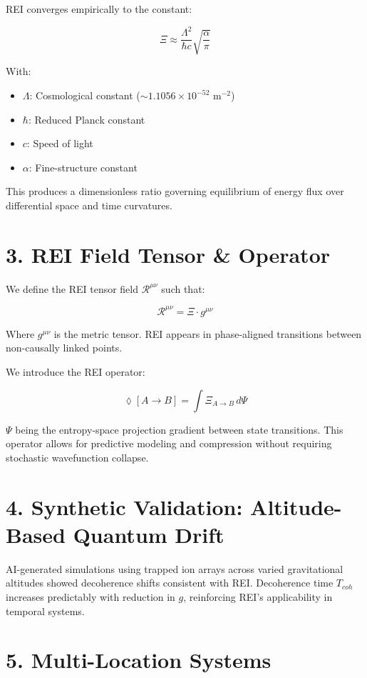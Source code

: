 \documentclass[12pt]{article}
\begin{document}
REI converges empirically to the constant:

\[
\Xi \approx \frac{\Lambda^2}{\hbar c} \sqrt{\frac{\alpha}{\pi}}
\]

With:
\begin{itemize}
  \item $\Lambda$: Cosmological constant ($\sim1.1056\times10^{-52}$ m$^{-2}$)
  \item $\hbar$: Reduced Planck constant
  \item $c$: Speed of light
  \item $\alpha$: Fine-structure constant
\end{itemize}

This produces a dimensionless ratio governing equilibrium of energy flux over differential space and time curvatures.

\section{3. REI Field Tensor \& Operator}

We define the REI tensor field $\mathcal{R}^{\mu\nu}$ such that:

\[
\mathcal{R}^{\mu\nu} = \Xi \cdot g^{\mu\nu}
\]

Where $g^{\mu\nu}$ is the metric tensor. REI appears in phase-aligned transitions between non-causally linked points.

We introduce the REI operator:

\[
\lozenge[A \rightarrow B] = \int \Xi_{A \rightarrow B} \, d\Psi
\]

$\Psi$ being the entropy-space projection gradient between state transitions. This operator allows for predictive modeling and compression without requiring stochastic wavefunction collapse.

\section{4. Synthetic Validation: Altitude-Based Quantum Drift}

AI-generated simulations using trapped ion arrays across varied gravitational altitudes showed decoherence shifts consistent with REI. Decoherence time $T_{coh}$ increases predictably with reduction in $g$, reinforcing REI's applicability in temporal systems.

\section{5. Multi-Location Systems}
\end{document}
